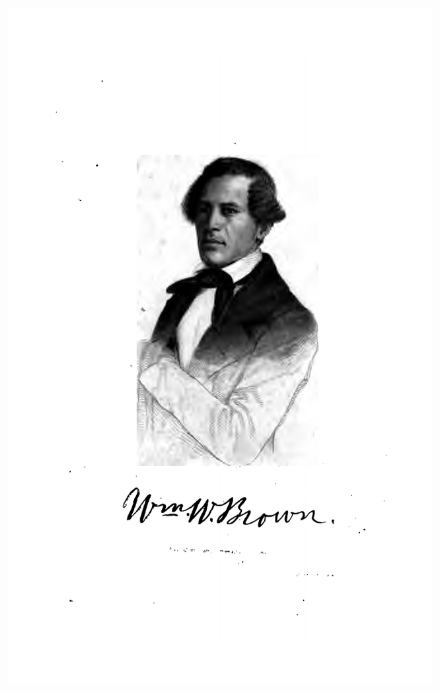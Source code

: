 \begin{absolutelynopagebreak}
\begin{vplace}
\begin{figure}[H]
\begin{adjustwidth}{-1.8cm}{}
  \vspace*{-2.5cm}
  \includegraphics[width=133mm]{./imgs/front1.jpg}  
\end{adjustwidth}
  \caption{}
\end{figure}
\end{vplace}

\thispagestyle{empty}
\end{absolutelynopagebreak}


